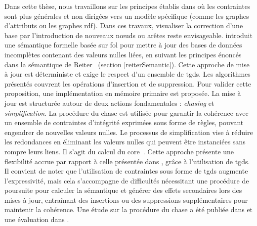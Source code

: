 \pagebreak
Dans cette thèse, nous travaillons sur les principes établis dans \cite{chabinConsistentUpdatingDatabases2020} où les contraintes sont plus générales et non dirigées vers un modèle spécifique (comme les graphes d'attributs ou les graphes \gls{rdf}).
Dans ces travaux, visualiser la correction d'une base par l'introduction de nouveaux nœuds ou arêtes reste envisageable.
\cite{chabinConsistentUpdatingDatabases2020} introduit une sémantique formelle basée sur \gls{fol} pour mettre à jour des bases de données incomplètes contenant des valeurs nulles liées, en suivant les principes énoncés dans la sémantique de Reiter~\cite{reiterSoundSometimesComplete1986} (section \ref{reiterSemantic}).
Cette approche de mise à jour est déterministe et exige le respect d'un ensemble de \glspl{tgd}.
Les algorithmes présentés couvrent les opérations d'insertion et de suppression.
Pour valider cette proposition, une implémentation en mémoire primaire est proposée.
La mise à jour est structurée autour de deux actions fondamentales : \emph{chasing} et \emph{simplification}.
La procédure du \gls{chase} est utilisée pour garantir la cohérence avec un ensemble de contraintes d'intégrité exprimées sous forme de règles, pouvant engendrer de nouvelles valeurs nulles.
Le processus de simplification vise à réduire les redondances en éliminant les valeurs nulles qui peuvent être instanciées sans rompre leurs liens.
Il s'agit du calcul du \gls{core}~\cite{faginDataExchangeGetting2005}.
Cette approche présente une flexibilité accrue par rapport à celle présentée dans \cite{chabinUsingGraphGrammar2019}, grâce à l'utilisation de \glspl{tgd}.
Il convient de noter que l'utilisation de contraintes sous forme de \glspl{tgd} augmente l'expressivité, mais cela s'accompagne de difficultés nécessitant une procédure de poursuite pour calculer la sémantique et générer des effets secondaires lors des mises à jour, entraînant des insertions ou des suppressions supplémentaires pour maintenir la cohérence.
Une étude sur la procédure du \gls{chase} a été publiée dans \cite{onetChaseProcedureIts2013} et une évaluation dans \cite{benediktBenchmarkingChase2017}.
